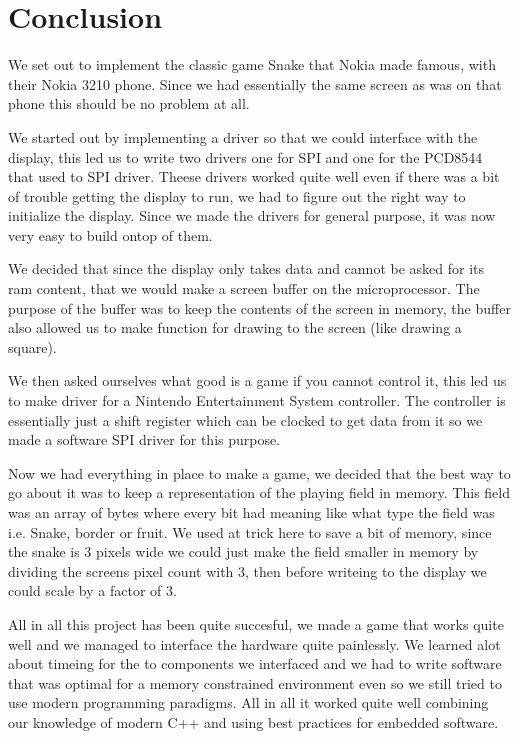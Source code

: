 \chapter*{Conclusion}

We set out to implement the classic game Snake that Nokia made famous,
with their Nokia 3210 phone. 
Since we had essentially the same screen as was on that phone this should be no problem at all.

We started out by implementing a driver so that we could interface with the display,
this led us to write two drivers one for SPI and one for the PCD8544 that used to SPI driver.
Theese drivers worked quite well even if there was a bit of trouble getting the display to run, we had to figure out the right way to initialize the display.
Since we made the drivers for general purpose, it was now very easy to build ontop of them.

We decided that since the display only takes data and cannot be asked for its ram content, that we 
would make a screen buffer on the microprocessor. The purpose of the buffer was to keep the contents of the screen in memory,
the buffer also allowed us to make function for drawing to the screen (like drawing a square).

We then asked ourselves what good is a game if you cannot control it, this led us to make driver for a Nintendo Entertainment System controller.
The controller is essentially just a shift register which can be clocked to get data from it so we made a software SPI driver for this purpose.

Now we had everything in place to make a game, we decided that the best way to go about it was to keep a representation of the playing field in memory.
This field was an array of bytes where every bit had meaning like what type the field was i.e. Snake, border or fruit.
We used at trick here to save a bit of memory, since the snake is 3 pixels wide we could just make the field smaller in memory by dividing the screens pixel count with 3,
then before writeing to the display we could scale by a factor of 3.

All in all this project has been quite succesful, we made a game that works quite well and we managed to interface the hardware quite painlessly.
We learned alot about timeing for the to components we interfaced and we had to write software that was optimal for a memory constrained environment even so we still tried to use modern programming paradigms.
All in all it worked quite well combining our knowledge of modern C++ and using best practices for embedded software.
